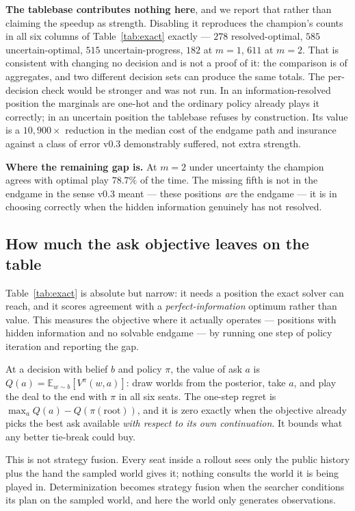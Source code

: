 \documentclass[11pt,a4paper]{article}
\begin{document}
\textbf{The tablebase contributes nothing here}, and we report that rather than
claiming the speedup as strength. Disabling it reproduces the champion's
counts in all six columns of Table~\ref{tab:exact} exactly --- $278$
resolved-optimal, $585$ uncertain-optimal, $515$ uncertain-progress, $182$ at
$m{=}1$, $611$ at $m{=}2$. That is consistent with changing no decision and is
not a proof of it: the comparison is of aggregates, and two different decision
sets can produce the same totals. The per-decision check would be stronger and
was not run. In an information-resolved position the marginals are one-hot and the
ordinary policy already plays it correctly; in an uncertain position the
tablebase refuses by construction. Its value is a $10{,}900\times$ reduction in
the median cost of the endgame path and insurance against a class of error v0.3
demonstrably suffered, not extra strength.

\textbf{Where the remaining gap is.} At $m{=}2$ under uncertainty the champion
agrees with optimal play $78.7\%$ of the time. The missing fifth is not in the
endgame in the sense v0.3 meant --- these positions \emph{are} the endgame --- it
is in choosing correctly when the hidden information genuinely has not resolved.

\subsection{How much the ask objective leaves on the table}
\label{sec:res-regret}

Table~\ref{tab:exact} is absolute but narrow: it needs a position the exact
solver can reach, and it scores agreement with a \emph{perfect-information}
optimum rather than value. This measures the objective where it actually
operates --- positions with hidden information and no solvable endgame --- by
running one step of policy iteration and reporting the gap.

At a decision with belief $b$ and policy $\pi$, the value of ask $a$ is
$Q(a) = \mathbb{E}_{w \sim b}[V^{\pi}(w, a)]$: draw worlds from the posterior,
take $a$, and play the deal to the end with $\pi$ in all six seats. The one-step
regret is $\max_a Q(a) - Q(\pi(\text{root}))$, and it is zero exactly when the
objective already picks the best ask available \emph{with respect to its own
continuation}. It bounds what any better tie-break could buy.

This is not strategy fusion. Every seat inside a rollout sees only the public
history plus the hand the sampled world gives it; nothing consults the world it
is being played in. Determinization becomes strategy fusion when the searcher
conditions its plan on the sampled world, and here the world only generates
observations.
\end{document}

